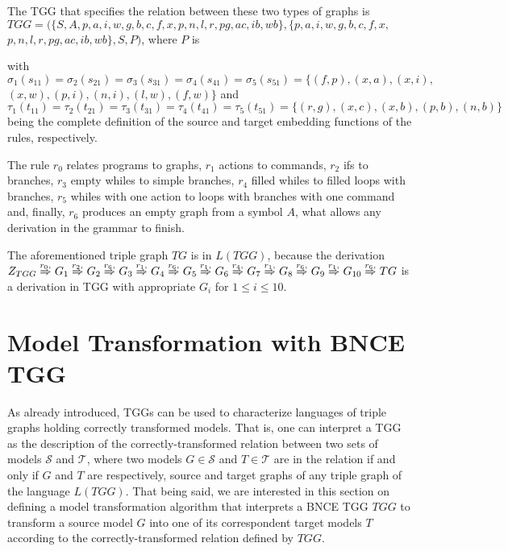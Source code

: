 \documentclass[runningheads]{llncs}
\begin{document}
\begin{example}
	
	
	The TGG that specifies the relation between these two types of graphs is $TGG = (\{S, A, p, a, i, w, g, b, c, f, x, p, n, l, r, pg, ac, ib, wb\}, \{p, a, i, w, g, b, c, f, x,$ $ p, n, l, r, pg, ac, ib, wb\}, S, P)$, where $P$ is
	
	
	
	\noindent
	with $\sigma_1(s_{11}) = \sigma_2(s_{21}) = \sigma_3(s_{31}) = \sigma_4(s_{41}) =\sigma_5(s_{51}) = \{ (f,p), (x,a), (x,i),$ $ (x,w), (p,i), (n,i), (l,w), (f,w) \}$ and $\tau_1(t_{11}) = \tau_2(t_{21}) = \tau_3(t_{31}) = \tau_4(t_{41}) =\tau_5(t_{51}) = \{ (r,g), (x,c), (x,b), (p,b), (n,b)\}$ being the complete definition of the source and target embedding functions of the rules, respectively.
	
	The rule $r_0$ relates programs to graphs, $r_1$ actions to commands, $r_2$ ifs to branches, $r_3$ empty whiles to simple branches, $r_4$ filled whiles to filled loops with branches, $r_5$ whiles with one action to loops with branches with one command and, finally, $r_6$ produces an empty graph from a symbol $A$, what allows any derivation in the grammar to finish.
	
	The aforementioned triple graph $TG$ is in $L(TGG)$, because the derivation
	$
	\startTG{TGG} \tderiv{r_0}{}{} G_1 \tderiv{r_2}{}{} G_2 \tderiv{r_6}{}{} G_3 \tderiv{r_1}{}{} G_4 \tderiv{r_6}{}{} G_5 \tderiv{r_1}{}{} G_6 \tderiv{r_4}{}{} G_7 \tderiv{r_1}{}{} G_8 \tderiv{r_6}{}{} G_9 \tderiv{r_1}{}{} G_{10} \tderiv{r_6}{}{} TG
	$
	is a derivation in TGG with appropriate $G_i$ for $1 \le i \le 10$.
\end{example}


\section{Model Transformation with BNCE TGG}
\label{sec:modeltrans}
As already introduced, TGGs can be used to characterize languages of triple graphs holding correctly transformed models. That is, one can interpret a TGG as the description of the correctly-transformed relation between two sets of models $\mathcal{S}$ and $\mathcal{T}$, where two models $G \in \mathcal{S}$ and $T \in \mathcal{T}$ are in the relation if and only if $G$ and $T$ are respectively, source and target graphs of any triple graph of the language $L(TGG)$. That being said, we are interested in this section on defining a model transformation algorithm that interprets a BNCE TGG $TGG$ to transform a source model $G$ into one of its correspondent target models $T$ according to the correctly-transformed relation defined by $TGG$.
\end{document}
